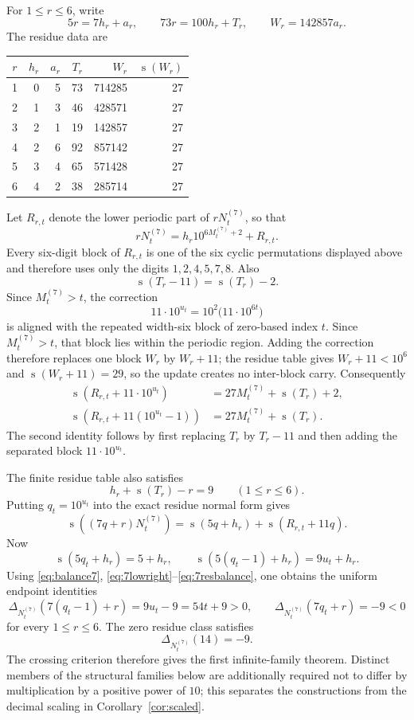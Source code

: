 \documentclass[11pt]{article}
\newcommand{\ds}{\operatorname{s}}
\newcommand{\Def}{\Delta}
\begin{document}
For $1\le r\le6$, write
\[
 5r=7h_r+a_r,
 \qquad
 73r=100h_r+T_r,
 \qquad
 W_r=142857a_r.
\]
The residue data are
\begin{center}
\small
\begin{tabular}{@{}c|rrrrr@{}}
\toprule
$r$ & $h_r$ & $a_r$ & $T_r$ & $W_r$ & $\ds(W_r)$\\
\midrule
1&0&5&73&714285&27\\
2&1&3&46&428571&27\\
3&2&1&19&142857&27\\
4&2&6&92&857142&27\\
5&3&4&65&571428&27\\
6&4&2&38&285714&27\\
\bottomrule
\end{tabular}
\end{center}
Let $R_{r,t}$ denote the lower periodic part of $rN^{(7)}_t$, so that
\[
 rN^{(7)}_t=h_r10^{6M^{(7)}_t+2}+R_{r,t}.
\]
Every six-digit block of $R_{r,t}$ is one of the six cyclic permutations displayed above and therefore uses only the digits $1,2,4,5,7,8$.  Also
\[
 \ds(T_r-11)=\ds(T_r)-2.
\]
Since $M^{(7)}_t>t$, the correction
\[
 11\cdot10^{u_t}=10^2\bigl(11\cdot10^{6t}\bigr)
\]
is aligned with the repeated width-six block of zero-based index $t$.  Since $M^{(7)}_t>t$, that block lies within the periodic region.  Adding the correction therefore replaces one block $W_r$ by $W_r+11$; the residue table gives $W_r+11<10^6$ and $\ds(W_r+11)=29$, so the update creates no inter-block carry.  Consequently
\begin{align}
 \ds(R_{r,t}+11\cdot10^{u_t})
   &=27M^{(7)}_t+\ds(T_r)+2,\label{eq:7lowright}\\
 \ds(R_{r,t}+11(10^{u_t}-1))
   &=27M^{(7)}_t+\ds(T_r).\label{eq:7lowleft}
\end{align}
The second identity follows by first replacing $T_r$ by $T_r-11$ and then adding the separated block $11\cdot10^{u_t}$.

The finite residue table also satisfies
\begin{equation}\label{eq:7resbalance}
 h_r+\ds(T_r)-r=9
 \qquad(1\le r\le6).
\end{equation}
Putting $q_t=10^{u_t}$ into the exact residue normal form gives
\[
 \ds((7q+r)N^{(7)}_t)
 =\ds(5q+h_r)+\ds(R_{r,t}+11q).
\]
Now
\[
 \ds(5q_t+h_r)=5+h_r,
 \qquad
 \ds(5(q_t-1)+h_r)=9u_t+h_r.
\]
Using \eqref{eq:balance7}, \eqref{eq:7lowright}--\eqref{eq:7resbalance}, one obtains the uniform endpoint identities
\begin{equation}\label{eq:7familycross}
 \Def_{N^{(7)}_t}(7(q_t-1)+r)=9u_t-9=54t+9>0,
 \qquad
 \Def_{N^{(7)}_t}(7q_t+r)=-9<0
\end{equation}
for every $1\le r\le6$.  The zero residue class satisfies
\[
 \Def_{N^{(7)}_t}(14)=-9.
\]
The crossing criterion therefore gives the first infinite-family theorem.  Distinct members of the structural families below are additionally required not to differ by multiplication by a positive power of $10$; this separates the constructions from the decimal scaling in Corollary~\ref{cor:scaled}.
\end{document}
